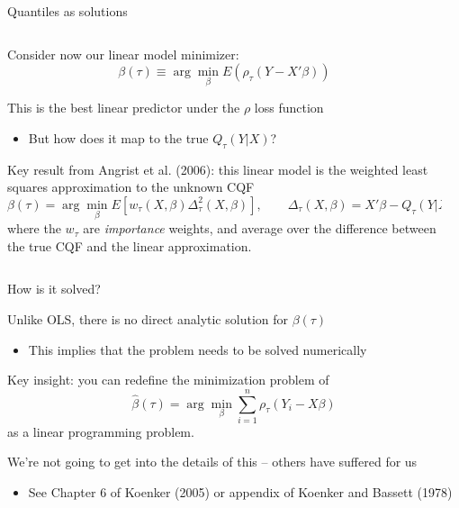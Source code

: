 \documentclass[notes,11pt, aspectratio=169]{beamer}
\newenvironment{wideitemize}{\itemize\addtolength{\itemsep}{10pt}}{\enditemize}
\begin{document}
\begin{frame}{Quantiles as solutions}
  \begin{columns}[T] %
\begin{column}{.9\textwidth}
    \begin{wideitemize}
    \item Consider now our linear model minimizer:
      \begin{equation*}
        \beta(\tau) \equiv \arg\min_{\beta} E(\rho_{\tau}(Y - X'\beta))
      \end{equation*}
    \item This is the best linear predictor under the $\rho$ loss function
      \begin{itemize}
      \item But how does it map to the true $Q_{\tau}(Y|X)$?
      \end{itemize}
    \item Key result from Angrist et al. (2006): this linear model is
      the weighted least squares approximation to the unknown CQF
      $$ \beta(\tau)  = \arg\min_{\beta}E\left[w_{\tau}(X, \beta) \Delta^{2}_{\tau}(X, \beta)\right], \qquad \Delta_{\tau}(X, \beta) = X'\beta - Q_{\tau}(Y|X),$$
      where the $w_{\tau}$ are \emph{importance} weights, and average
      over the difference between the true CQF and the linear
      approximation.
    \end{wideitemize}
  \end{column}%
  \hfill%
  \begin{column}{.3\textwidth}
  \end{column}
\end{columns}
\end{frame}


\begin{frame}{How is it solved?}
  \begin{wideitemize}
  \item Unlike OLS, there is no direct analytic solution for
    $\beta(\tau)$
    \begin{itemize}
    \item This implies that the problem needs to be solved numerically
    \end{itemize}
  \item Key insight: you can redefine the minimization problem of
    $$\hat{\beta}(\tau) = \arg\min_{\beta} \sum_{i=1}^{n} \rho_{\tau}(Y_{i} - X\beta)$$
    as a linear programming problem.
  \item We're not going to get into the details of this -- others have suffered for us
    \begin{itemize}
    \item See Chapter 6 of Koenker (2005)  or appendix of Koenker and Bassett
    (1978)
    \end{itemize}
  \end{wideitemize}
\end{frame}
\end{document}
